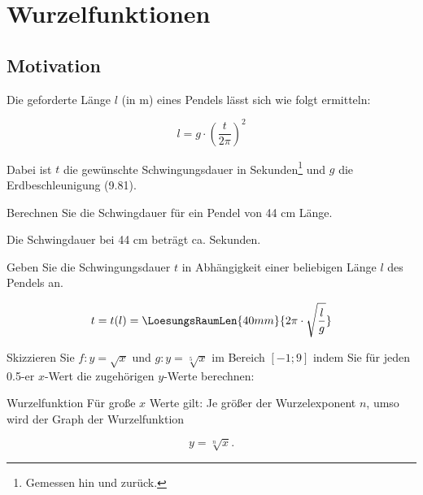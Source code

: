 \section{Wurzelfunktionen}

\subsection{Motivation}

Die geforderte Länge $l$ (in m) eines Pendels lässt sich wie folgt ermitteln:

$$l = g \cdot{} \left(\frac{t}{2\pi}\right)^2$$


Dabei ist $t$ die gewünschte Schwingungsdauer in
Sekunden\footnote{Gemessen hin und zurück.} und $g$ die
Erdbeschleunigung (9.81).

Berechnen Sie die Schwingdauer für ein Pendel von 44 cm Länge.

\vspace{4mm}

Die Schwingdauer bei 44 cm beträgt ca.  Sekunden.


Geben Sie die Schwingungsdauer $t$ in Abhängigkeit einer beliebigen
Länge $l$ des Pendels an.

$$t = t(l) = \LoesungsRaumLen{40mm}{2\pi \cdot{} \sqrt{\frac{l}{g}}}$$




\newpage

Skizzieren Sie $f: y = \sqrt{x}$ und $g: y=\sqrt[5]{x}$ im Bereich $[-1; 9]$ indem Sie für jeden 0.5-er $x$-Wert die zugehörigen $y$-Werte berechnen:


\begin{bemerkung}{Wurzelfunktion}{}
Für große $x$ Werte gilt: Je größer der Wurzelexponent $n$, umso
 wird der Graph der Wurzelfunktion

$$y=\sqrt[n]{x}.$$ 

\end{bemerkung}


